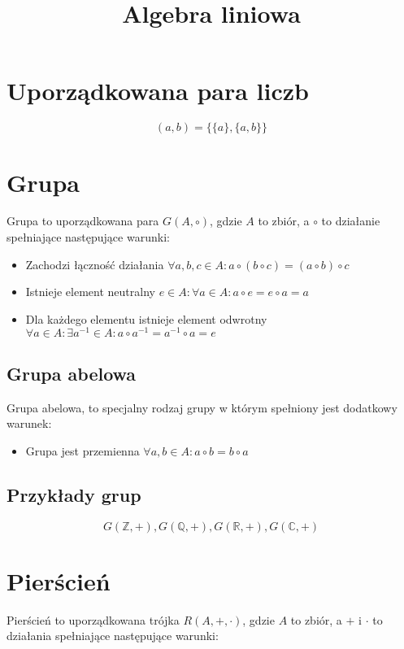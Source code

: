 \documentclass{../notatki}
\title{Algebra liniowa}
\begin{document}
\tableofcontents

\section{Uporządkowana para liczb}

$$
(a, b) = \{ \{a\}, \{a, b\} \}
$$

\section{Grupa}

Grupa to uporządkowana para $G(A, \circ)$, gdzie $A$ to zbiór, a $\circ$ to działanie spełniające następujące warunki:

\begin{itemize}
    \item Zachodzi łączność działania $\forall a, b, c \in A: a \circ (b \circ c) = (a \circ b) \circ c$
    \item Istnieje element neutralny $e \in A: \forall a \in A: a \circ e = e \circ a = a$
    \item Dla każdego elementu istnieje element odwrotny $\forall a \in A: \exists a^{-1} \in A: a \circ a^{-1} = a^{-1} \circ a = e$
\end{itemize}

\subsection{Grupa abelowa}

Grupa abelowa, to specjalny rodzaj grupy w którym spełniony jest dodatkowy warunek:

\begin{itemize}
    \item Grupa jest przemienna $\forall a, b \in A: a \circ b = b \circ a$
\end{itemize}

\subsection{Przykłady grup}

$$
G(\mathbb{Z}, +), G(\mathbb{Q}, +), G(\mathbb{R}, +), G(\mathbb{C}, +)
$$

\section{Pierścień}

Pierścień to uporządkowana trójka $R(A, +, \cdot)$, gdzie $A$ to zbiór, a $+$ i $\cdot$ to działania spełniające następujące warunki:
\end{document}
